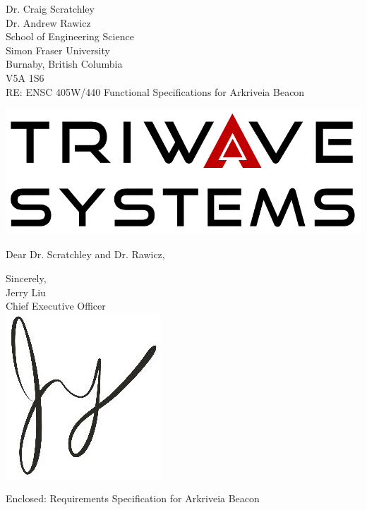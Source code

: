 \documentclass[11pt]{letter}
\date{July 21, 2019}
\begin{document}
\begin{letter}{
Dr. Craig Scratchley\\
Dr. Andrew Rawicz\\
School of Engineering Science\\
Simon Fraser University\\
Burnaby, British Columbia\\
V5A 1S6\\
\bigskip
RE: ENSC 405W/440 Functional Specifications for Arkriveia Beacon\\
} 


\begin{center}
\includegraphics[scale=0.25]{./images/logo_W.png}
\end{center}


\opening{Dear Dr. Scratchley and Dr. Rawicz,} 
 
 
 
 
 
\medskip
Sincerely,\\
Jerry Liu\\
Chief Executive Officer\\

\vspace*{-0.25cm}
\includegraphics[scale=0.8]{./images/signature.jpg}

{Enclosed: Requirements Specification for Arkriveia Beacon}

\end{letter}
\end{document}
